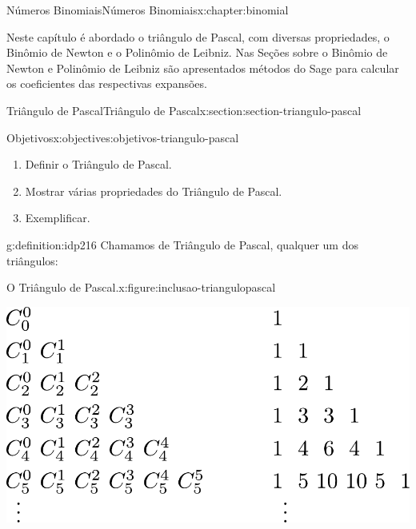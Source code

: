 \documentclass[oneside,10pt,]{book}
\numberwithin{equation}{section}
\begin{document}
\begin{chapterptx}{Números Binomiais}{}{Números Binomiais}{}{}{x:chapter:binomial}
\begin{introduction}{}%
Neste capítulo é abordado o triângulo de Pascal, com diversas propriedades, o Binômio de Newton e o Polinômio de Leibniz. Nas Seções sobre o Binômio de Newton e Polinômio de Leibniz são apresentados métodos do Sage para calcular os coeficientes das respectivas expansões.%
\end{introduction}%
%
%
\typeout{************************************************}
\typeout{************************************************}
%
\begin{sectionptx}{Triângulo de Pascal}{}{Triângulo de Pascal}{}{}{x:section:section-triangulo-pascal}
\begin{objectives}{Objetivos}{x:objectives:objetivos-triangulo-pascal}
%
\begin{enumerate}
\item{}Definir o Triângulo de Pascal.%
\item{}Mostrar várias propriedades do Triângulo de Pascal.%
\item{}Exemplificar.%
\end{enumerate}
\end{objectives}
\begin{definition}{}{g:definition:idp216}%
Chamamos de Triângulo de Pascal, qualquer um dos triângulos: %
\begin{figureptx}{O Triângulo de Pascal.}{x:figure:inclusao-triangulopascal}{}%
\begin{image}{0.1}{0.8}{0.1}%
\includegraphics[width=\linewidth]{images/triangulopascal}
\end{image}%
\tcblower
\end{figureptx}%
\end{definition}

\end{sectionptx}
\end{chapterptx}
\end{document}
